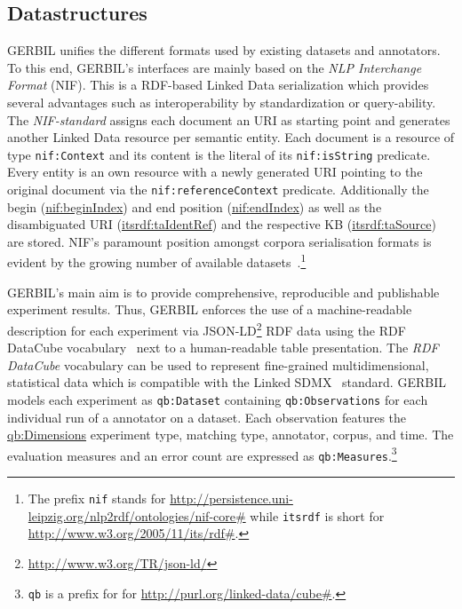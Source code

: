 \subsection{Datastructures}
\label{cha334:sec:datastructures}

GERBIL unifies the different formats used by existing datasets and annotators.
To this end, GERBIL's interfaces are mainly based on the \emph{NLP Interchange Format} (NIF).
This is a RDF-based Linked Data serialization which provides several advantages such as interoperability by standardization or query-ability.
The \emph{NIF-standard} assigns each document an URI as starting point and generates another Linked Data resource per semantic entity.
Each document is a resource of type \texttt{nif:Context} and its content is the literal of its \texttt{nif:isString} predicate. 
Every entity is an own resource with a newly generated URI pointing to the original document via the \texttt{nif:referenceContext} predicate.
Additionally the begin (\url{nif:beginIndex}) and end position (\url{nif:endIndex}) as well as the disambiguated URI (\url{itsrdf:taIdentRef}) and the respective KB (\url{itsrdf:taSource}) are stored.
NIF's paramount position amongst corpora serialisation formats is evident by the growing number of available datasets~\cite{GERBIL}.\footnote{The prefix \texttt{nif} stands for \url{http://persistence.uni-leipzig.org/nlp2rdf/ontologies/nif-core\#} while \texttt{itsrdf} is short for \url{http://www.w3.org/2005/11/its/rdf\#}.}

GERBIL's main aim is to provide comprehensive, reproducible and publishable experiment results.
Thus, GERBIL enforces the use of a machine-readable description for each experiment via JSON-LD\footnote{\url{http://www.w3.org/TR/json-ld/}} RDF data using the RDF DataCube vocabulary~\cite{datacube} next to a human-readable table presentation.
The \emph{RDF DataCube} vocabulary can be used to represent fine-grained multidimensional, statistical data which is compatible with the Linked SDMX~\cite{LinkedSDMX} standard. 
GERBIL models each experiment as \texttt{qb:Dataset} containing \texttt{qb:Observations} for each individual run of a annotator on a dataset.
Each observation features the \url{qb:Dimensions} experiment type, matching type, annotator, corpus, and time. 
The evaluation measures and an error count are expressed as \texttt{qb:Measures}.\footnote{\texttt{qb} is a prefix for for \url{http://purl.org/linked-data/cube\#}.} 

